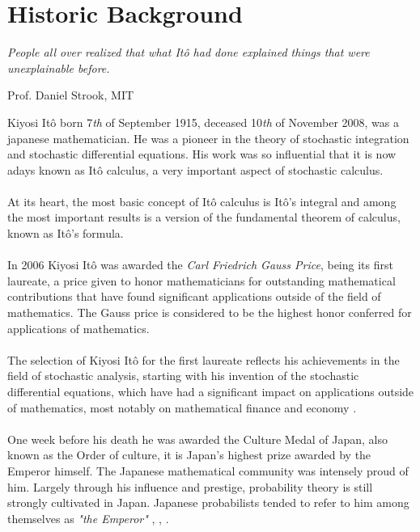 \documentclass[11pt,a4paper, final]{article}
\begin{document}
\newpage
\thispagestyle{empty}
\tableofcontents
\newpage
\section{Historic Background}



\epigraph{\textit{People all over realized that what Itô had done explained things that were unexplainable before.}}{Prof. Daniel Strook, MIT}

\noindent Kiyosi Itô born 7\textit{th} of September 1915, deceased 10\textit{th} of November 2008, was a japanese mathematician. He was a pioneer in the theory of stochastic integration and stochastic differential equations. His work was so influential that it is now adays known as Itô calculus, a very important aspect of stochastic calculus. 
\\\\
At its heart, the most basic concept of Itô calculus is Itô's integral and among the most important results is a version of the fundamental theorem of calculus, known as Itô's formula.
\\\\
In 2006 Kiyosi Itô was awarded the \textit{Carl Friedrich Gauss Price}, being its first laureate, a price given to honor mathematicians for outstanding mathematical contributions that have found significant applications outside of the field of mathematics. The Gauss price is considered to be the highest honor conferred for applications of mathematics.
\\
\\
The selection of Kiyosi Itô for the first laureate reflects his achievements in the field of stochastic analysis, starting with his invention of the stochastic differential equations, which have had a significant impact on applications outside of mathematics, most notably on mathematical finance and economy \cite{KyotoUni}.
\\\\
One week before his death he was awarded the Culture Medal of Japan, also known as the Order of culture, it is Japan's highest prize awarded by the Emperor himself. The Japanese mathematical community was intensely proud of him. Largely through his influence and prestige, probability theory is still strongly cultivated in Japan. Japanese probabilists tended to refer to him among themselves as \textit{"the Emperor"} \cite{Turnbull}, \cite{Emperor}, \cite{MacTutor}. 
\newpage 
\end{document}
